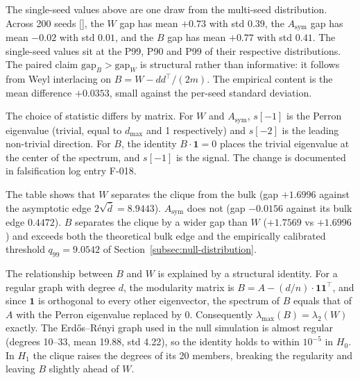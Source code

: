 \documentclass[11pt,a4paper]{article}
\newcommand{\fref}[1]{[\path{#1}]}
\numberwithin{equation}{section}
\numberwithin{table}{section}
\begin{document}
\begin{table}[H]
\centering
\caption{Leading non-trivial eigenvalue of the three candidate matrices in $H_0$ and in $H_1$, with the bulk edge and the gap (single draw, seed 42).}
\label{tab:clique-spectra}
\end{table}

The single-seed values above are one draw from the multi-seed distribution. Across 200 seeds \fref{verification/rmt/clique_spectra_seeds.py}, the $W$ gap has mean $+0.73$ with std $0.39$, the $A_{\mathrm{sym}}$ gap has mean $-0.02$ with std $0.01$, and the $B$ gap has mean $+0.77$ with std $0.41$. The single-seed values sit at the P99, P90 and P99 of their respective distributions. The paired claim $\mathrm{gap}_B > \mathrm{gap}_W$ is structural rather than informative: it follows from Weyl interlacing on $B = W - dd^{\top}/(2m)$. The empirical content is the mean difference $+0.0353$, small against the per-seed standard deviation.

The choice of statistic differs by matrix. For $W$ and $A_{\mathrm{sym}}$, $s[-1]$ is the Perron eigenvalue (trivial, equal to $d_{\max}$ and 1 respectively) and $s[-2]$ is the leading non-trivial direction. For $B$, the identity $B \cdot \mathbf{1} = 0$ places the trivial eigenvalue at the center of the spectrum, and $s[-1]$ is the signal. The change is documented in falsification log entry F-018.

The table shows that $W$ separates the clique from the bulk (gap $+1.6996$ against the asymptotic edge $2\sqrt{\bar{d}} = 8.9443$). $A_{\mathrm{sym}}$ does not (gap $-0.0156$ against its bulk edge $0.4472$). $B$ separates the clique by a wider gap than $W$ ($+1.7569$ vs $+1.6996$) and exceeds both the theoretical bulk edge and the empirically calibrated threshold $q_{99} = 9.0542$ of Section~\ref{subsec:null-distribution}.

The relationship between $B$ and $W$ is explained by a structural identity. For a regular graph with degree $d$, the modularity matrix is $B = A - (d/n) \cdot \mathbf{1}\mathbf{1}^{\top}$, and since $\mathbf{1}$ is orthogonal to every other eigenvector, the spectrum of $B$ equals that of $A$ with the Perron eigenvalue replaced by 0. Consequently $\lambda_{\max}(B) = \lambda_2(W)$ exactly. The Erd\H{o}s--R\'enyi graph used in the null simulation is almost regular (degrees 10--33, mean 19.88, std 4.22), so the identity holds to within $10^{-5}$ in $H_0$. In $H_1$ the clique raises the degrees of its 20 members, breaking the regularity and leaving $B$ slightly ahead of $W$.
\end{document}
